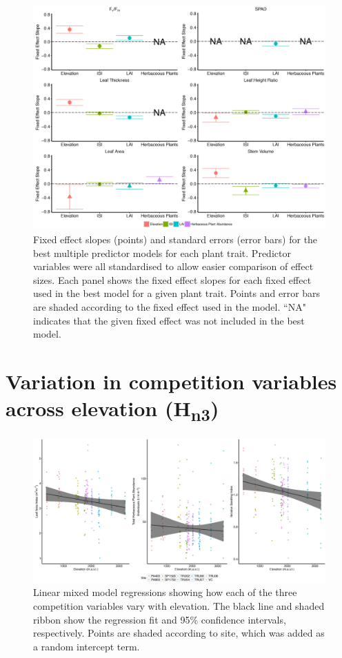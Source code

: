 \documentclass[a4paper,10pt,]{report}
\begin{document}
\begin{figure}[H]
\centering
\includegraphics[width = \textwidth]{fix_eff.pdf}
\caption{Fixed effect slopes (points) and standard errors (error bars) for the best multiple predictor models for each plant trait. Predictor variables were all standardised to allow easier comparison of effect sizes. Each panel shows the fixed effect slopes for each fixed effect used in the best model for a given plant trait. Points and error bars are shaded according to the fixed effect used in the model. ``NA" indicates that the given fixed effect was not included in the best model.}
\label{fig:fix_eff}
\end{figure}



\section{Variation in competition variables across elevation (H\textsubscript{n3})}
\begin{figure}[H]
\centering
\includegraphics[scale=0.34]{env_elev.pdf}
\caption{Linear mixed model regressions showing how each of the three competition variables vary with elevation. The black line and shaded ribbon show the regression fit and 95\% confidence intervals, respectively. Points are shaded according to site, which was added as a random intercept term.}
\label{fig:env_elev}
\end{figure}
\end{document}
